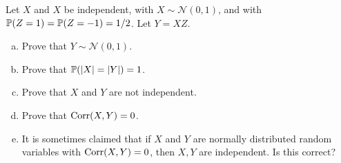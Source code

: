 \begin{problem}
	Let $ X $ and $ X $ be independent, with $ X\sim\mathcal{N}(0,1) $, and with $ \mathbb{P}(Z=1)=\mathbb{P}(Z=-1)=1/2 $. Let $ Y = XZ $.
	\begin{enumerate}[(a)]
		\item Prove that $ Y \sim \mathcal{N}(0,1) $.
		\item Prove that $ \mathbb{P}(|X| = |Y|) = 1 $.
		\item Prove that $ X $ and $ Y $ are not independent.
		\item Prove that $ \operatorname{Corr}(X,Y) = 0 $.
		\item It is sometimes claimed that if $ X $ and $ Y $ are normally distributed random variables with $ \operatorname{Corr}(X,Y)=0 $, then $ X,Y $ are independent. Is this correct?
	\end{enumerate}
\end{problem}

